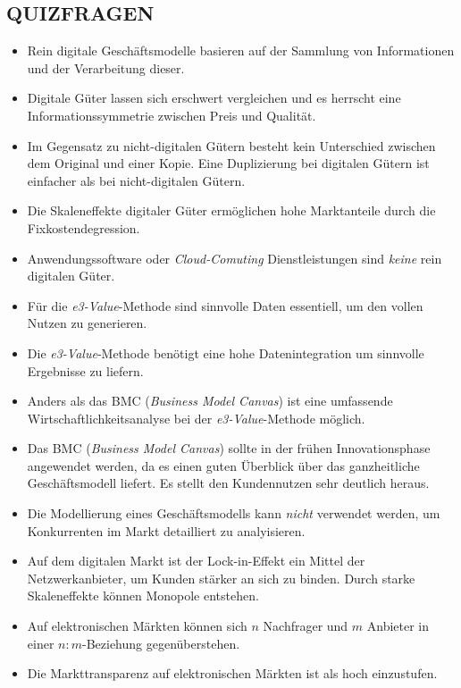 \documentclass[12pt,a4paper]{article}
\begin{document}



\vspace{0.5cm}
\subsection{QUIZFRAGEN} %
\begin{itemize}
   \item Rein digitale Geschäftsmodelle basieren auf der Sammlung von Informationen und der Verarbeitung dieser.
   \item Digitale Güter lassen sich erschwert vergleichen und es herrscht eine Informationssymmetrie zwischen Preis und Qualität.
   \item Im Gegensatz zu nicht-digitalen Gütern besteht kein Unterschied zwischen dem Original und einer Kopie.
         Eine Duplizierung bei digitalen Gütern ist einfacher als bei nicht-digitalen Gütern.
   \item Die Skaleneffekte digitaler Güter ermöglichen hohe Marktanteile durch die Fixkostendegression.
   \item Anwendungssoftware oder \textit{Cloud-Comuting} Dienstleistungen sind \emph{keine} rein digitalen Güter.
   
   \item Für die \textit{e3-Value}-Methode sind sinnvolle Daten essentiell, um den vollen Nutzen zu generieren.
   \item Die \textit{e3-Value}-Methode benötigt eine hohe Datenintegration um sinnvolle Ergebnisse zu liefern.
   \item Anders als das BMC (\textit{Business Model Canvas}) ist eine umfassende Wirtschaftlichkeitsanalyse bei der \textit{e3-Value}-Methode möglich.
   \item Das BMC (\textit{Business Model Canvas}) sollte in der frühen Innovationsphase angewendet werden, da es einen guten Überblick über das ganzheitliche Geschäftsmodell liefert.
         Es stellt den Kundennutzen sehr deutlich heraus.
   \item Die Modellierung eines Geschäftsmodells kann \emph{nicht} verwendet werden, um Konkurrenten im Markt detailliert zu analyisieren.
   
   \item Auf dem digitalen Markt ist der Lock-in-Effekt ein Mittel der Netzwerkanbieter, um Kunden stärker an sich zu binden.
         Durch starke Skaleneffekte können Monopole entstehen.
   \item Auf elektronischen Märkten können sich $n$ Nachfrager und $m$ Anbieter in einer $n:m$-Beziehung gegenüberstehen.
   \item Die Markttransparenz auf elektronischen Märkten ist als hoch einzustufen.
\end{itemize}
\end{document}
